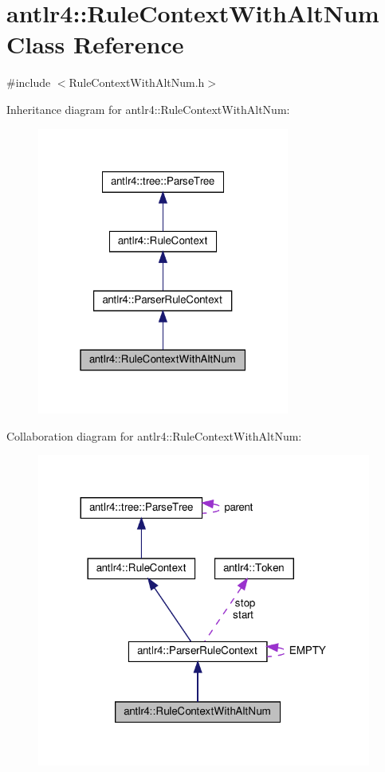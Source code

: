\hypertarget{classantlr4_1_1RuleContextWithAltNum}{}\section{antlr4\+:\+:Rule\+Context\+With\+Alt\+Num Class Reference}
\label{classantlr4_1_1RuleContextWithAltNum}


{\ttfamily \#include $<$Rule\+Context\+With\+Alt\+Num.\+h$>$}



Inheritance diagram for antlr4\+:\+:Rule\+Context\+With\+Alt\+Num\+:
\nopagebreak
\begin{figure}[H]
\begin{center}
\leavevmode
\includegraphics[width=235pt]{classantlr4_1_1RuleContextWithAltNum__inherit__graph}
\end{center}
\end{figure}


Collaboration diagram for antlr4\+:\+:Rule\+Context\+With\+Alt\+Num\+:
\nopagebreak
\begin{figure}[H]
\begin{center}
\leavevmode
\includegraphics[width=311pt]{classantlr4_1_1RuleContextWithAltNum__coll__graph}
\end{center}
\end{figure}
